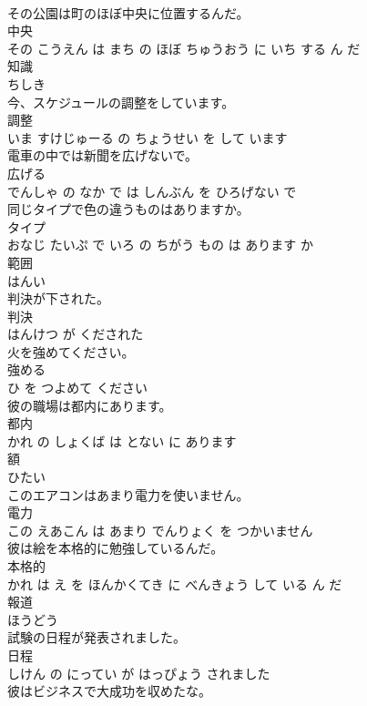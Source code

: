 \documentclass[8pt]{extreport}
\begin{document}
\begin{CJK}{UTF8}{min}
\\	その公園は町のほぼ中央に位置するんだ。	
\\	中央 
\\	その こうえん は まち の ほぼ ちゅうおう に いち する ん だ			
\\	知識	
\\	ちしき		
\\	今、スケジュールの調整をしています。	
\\	調整 
\\	いま すけじゅーる の ちょうせい を して います			
\\	電車の中では新聞を広げないで。	
\\	広げる 
\\	でんしゃ の なか で は しんぶん を ひろげない で			
\\	同じタイプで色の違うものはありますか。	
\\	タイプ 
\\	おなじ たいぷ で いろ の ちがう もの は あります か			
\\	範囲	
\\	はんい		
\\	判決が下された。	
\\	判決 
\\	はんけつ が くだされた			
\\	火を強めてください。	
\\	強める 
\\	ひ を つよめて ください			
\\	彼の職場は都内にあります。	
\\	都内 
\\	かれ の しょくば は とない に あります			
\\	額	
\\	ひたい		
\\	このエアコンはあまり電力を使いません。	
\\	電力 
\\	この えあこん は あまり でんりょく を つかいません			
\\	彼は絵を本格的に勉強しているんだ。	
\\	本格的 
\\	かれ は え を ほんかくてき に べんきょう して いる ん だ			
\\	報道	
\\	ほうどう		
\\	試験の日程が発表されました。	
\\	日程 
\\	しけん の にってい が はっぴょう されました			
\\	彼はビジネスで大成功を収めたな。	

\end{CJK}
\end{document}
